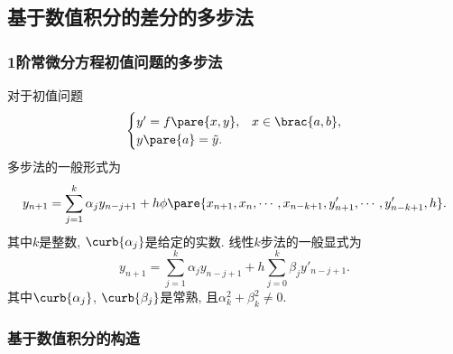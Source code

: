\documentclass[hidelinks]{ctexart}
\begin{document}


\subsection{基于数值积分的差分的多步法} %
\label{sub:基于数值积分的差分的多步法}

\subsubsection{1阶常微分方程初值问题的多步法} %
\label{ssub:1阶常微分方程初值问题的多步法}

对于初值问题
\[ \begin{cases}
    y' = f\pare{x,y},& x\in\brac{a,b}, \\
    y\pare{a} = \tilde{y}.
\end{cases} \]
多步法的一般形式为
\[ y_{n+1} = \sum_{j=1}^k \alpha_j y_{n-j+1} + h\phi\pare{x_{n+1},x_n,\cdots,x_{n-k+1},y'_{n+1},\cdots,y'_{n-k+1},h}. \]
其中$k$是整数, $\curb{\alpha_j}$是给定的实数. 线性$k$步法的一般显式为
\[ y_{n+1} = \sum_{j=1}^k \alpha_j y_{n-j+1} + h\sum_{j=0}^k \beta_j y'_{n-j+1}. \]
其中$\curb{\alpha_j}$, $\curb{\beta_j}$是常熟, 且$\alpha_k^2 + \beta_k^2 \neq 0$.


\subsubsection{基于数值积分的构造} %
\label{ssub:基于数值积分的构造}
\end{document}
